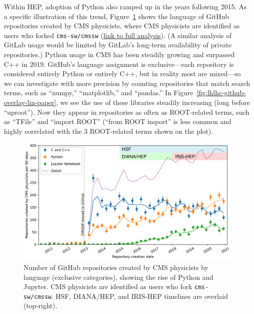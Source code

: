 \documentclass{article}
\begin{document}
Within HEP, adoption of Python also ramped up in the years following 2015. As a specific illustration of this trend, Figure~\ref{fig:lhlhc-github-languages-paper} shows the language of GitHub repositories created by CMS physicists, where CMS physicists are identified as users who forked {\tt cms-sw/cmssw} (\href{https://github.com/jpivarski-talks/2021-02-24-reload-statistics}{link to full analysis}). (A similar analysis of GitLab usage would be limited by GitLab's long-term availability of private repositories.) Python usage in CMS has been steadily growing and surpassed C++ in 2019. GitHub's language assignment is exclusive---each repository is considered entirely Python or entirely C++, but in reality most are mixed---so we can investigate with more precision by counting repositories that match search terms, such as ``numpy,'' ``matplotlib,'' and ``pandas.'' In Figure~\ref{fig:lhlhc-github-overlay-lin-paper}, we see the use of these libraries steadily increasing (long before ``uproot''). Now they appear in repositories as often as ROOT-related terms, such as ``TFile'' and ``import ROOT'' (``from ROOT import'' is less common and highly correlated with the 3 ROOT-related terms shown on the plot).

\begin{figure}
\centering
\includegraphics[width=0.8\linewidth]{fig/lhlhc-github-languages-paper.pdf}

\caption{Number of GitHub repositories created by CMS physicists by language (exclusive categories), showing the rise of Python and Jupyter. CMS physicists are identified as users who fork {\tt cms-sw/cmssw}. HSF, DIANA/HEP, and IRIS-HEP timelines are overlaid (top-right). \label{fig:lhlhc-github-languages-paper}}
\end{figure}
\end{document}
